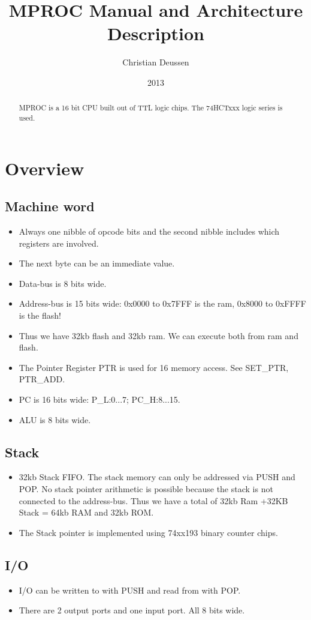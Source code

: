\documentclass[a4paper, 12pt]{article}
\title{MPROC Manual and Architecture Description}
\author{Christian Deussen}
\date{2013}
\begin{document}
	\maketitle
	\begin{abstract}
		MPROC is a 16 bit CPU built out of TTL logic chips. The 74HCTxxx logic series is used.
	\end{abstract}
	\tableofcontents
	\newpage
	\section{Overview}
	\subsection {Machine word}
	\begin{itemize}
		\item Always one nibble of opcode bits and the second nibble includes which registers are involved.
		\item The next byte can be an immediate value.
		\item Data-bus is 8 bits wide.
		\item Address-bus is 15 bits wide: 0x0000 to 0x7FFF is the ram, 0x8000 to 0xFFFF is the flash! 
		\item Thus we have 32kb flash and 32kb ram. We can execute both from ram and flash.
		\item The Pointer Register PTR is used for 16 memory access. See SET\_PTR, PTR\_ADD.
		\item PC is 16 bits wide: P\_L:0...7; PC\_H:8...15.
		\item ALU is 8 bits wide.
	\end{itemize}

	\subsection {Stack}
	\begin{itemize}
		\item 32kb Stack FIFO. The stack memory can only be addressed via PUSH and POP. No stack pointer arithmetic is possible because the stack is not connected to the address-bus. Thus we have a total of 32kb Ram +32KB Stack = 64kb RAM and 32kb ROM.
		\item The Stack pointer is implemented using 74xx193 binary counter chips. 
	\end{itemize}

	\subsection{I/O}
	\begin{itemize}
		\item I/O can be written to with PUSH and read from with POP. 
		\item There are 2 output ports and one input port. All 8 bits wide.
	\end{itemize}
\end{document}
